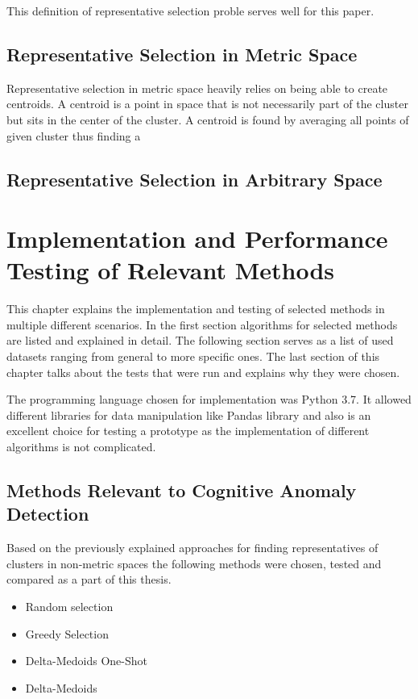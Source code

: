 \documentclass[thesis=B,english]{FITthesis}[2012/10/20]
\begin{document}
This definition of representative selection proble serves well for this paper.


\section{Representative Selection in Metric Space}
Representative selection in metric space heavily relies on being able to create centroids.
A centroid is a point in space that is not necessarily part of the cluster but sits in the center of the cluster.
A centroid is found by averaging all points of given cluster thus finding a

\section{Representative Selection in Arbitrary Space}


\chapter{Implementation and Performance Testing of Relevant Methods}

This chapter explains the implementation and testing of selected methods in multiple different scenarios.
In the first section algorithms for selected methods are listed and explained in detail.
The following section serves as a list of used datasets ranging from general to more specific ones.
The last section of this chapter talks about the tests that were run and explains why they were chosen.

The programming language chosen for implementation was Python 3.7.
It allowed different libraries for data manipulation like Pandas library and also is an excellent choice for testing a prototype as the implementation of different algorithms is not complicated.

\section{Methods Relevant to Cognitive Anomaly Detection}

Based on the previously explained approaches for finding representatives of clusters in non-metric spaces the following methods were chosen, tested and compared as a part of this thesis.
\begin{itemize}
    \item Random selection
    \item Greedy Selection
    \item Delta-Medoids One-Shot
    \item Delta-Medoids 
\end{itemize}
\end{document}
